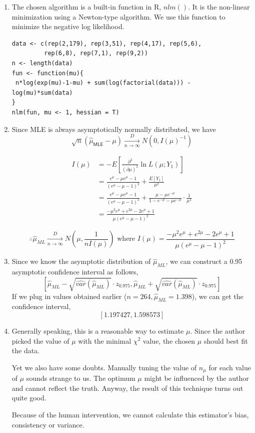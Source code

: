 \documentclass[11pt]{article}
\begin{document}
\begin{enumerate}
\item
The chosen algorithm is a built-in function in R, $nlm()$. It is the non-linear minimization using a Newton-type algorithm. We use this function to minimize the negative log likelihood.

\begin{lstlisting}[frame=single]
data <- c(rep(2,179), rep(3,51), rep(4,17), rep(5,6), 
         rep(6,8), rep(7,1), rep(9,2))
n <- length(data)
fun <- function(mu){
 n*log(exp(mu)-1-mu) + sum(log(factorial(data))) - log(mu)*sum(data) 
}
nlm(fun, mu <- 1, hessian = T)
\end{lstlisting}



\item Since MLE is always asymptotically normally distributed, we have 
$$\sqrt{n}\left( \hat{\mu}_{\mathsf{MLE}} -\mu \right)  \xrightarrow[n\rightarrow \infty]{D} 
N\left( 0,I(\mu)^{-1} \right)$$

\begin{equation*}
\begin{split}
I(\mu) &= -E[\frac{\partial^2}{(\partial \mu)^2} \ln L(\mu;Y_1)] \\
&=\frac{e^\mu-\mu e^\mu - 1}{(e^\mu-\mu-1)^2} + \frac{E[Y_1]}{\mu^2} \\
&=\frac{e^\mu-\mu e^\mu - 1}{(e^\mu-\mu-1)^2} + 
\frac{\mu-\mu e^{-\mu}}{1-e^{-\mu}-\mu e^{-\mu}} \cdot \frac{1}{\mu^2} \\
&= \frac{-\mu^2e^\mu + e^{2\mu} - 2e^\mu + 1}{\mu(e^\mu-\mu-1)^2}
\end{split}
\end{equation*}

$$\therefore \hat{\mu}_{ML} \xrightarrow[n\rightarrow\infty]{D} N\left( \mu, \frac{1}{nI(\mu)} \right)
\mbox{ where } I(\mu) = \frac{-\mu^2e^\mu + e^{2\mu} - 2e^\mu + 1}{\mu(e^\mu-\mu-1)^2}$$

\item
Since we know the asymptotic distribution of $\hat{\mu}_{ML}$, we can construct a 0.95 asymptotic confidence interval as follows,
$$\left[\hat{\mu}_{ML}-\sqrt{\widehat{var}(\hat{\mu}_{ML})} \cdot z_{0.975},
\hat{\mu}_{ML}+\sqrt{\widehat{var}(\hat{\mu}_{ML})} \cdot z_{0.975}   \right]$$
If we plug in values obtained earlier ($n=264, \hat{\mu}_{ML}=1.398$), we can get the confidence interval, 
$$[1.197427, 1.598573]$$

\item Generally speaking, this is a reasonable way to estimate $\mu$. Since the author picked the value of $\mu$ with the minimal $\chi^2$ value, the chosen $\mu$ should best fit the data. \par
Yet we also have some doubts. Manually tuning the value of $n_\mu$ for each value of $\mu$ sounds strange to us. The optimum $\mu$ might be influenced by the author and cannot reflect the truth. Anyway, the result of this technique turns out quite good. \par
Because of the human intervention, we cannot calculate this estimator's bias, consistency or variance.


\end{enumerate}
\end{document}
